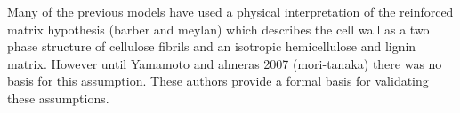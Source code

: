 Many of the previous models have used a physical interpretation of the
reinforced matrix hypothesis (barber and meylan) which describes the cell wall
as a two phase structure of cellulose fibrils and an isotropic hemicellulose and
lignin matrix. However until Yamamoto and almeras 2007 (mori-tanaka) there was
no basis for this assumption. These authors provide a formal basis for validating
these assumptions.